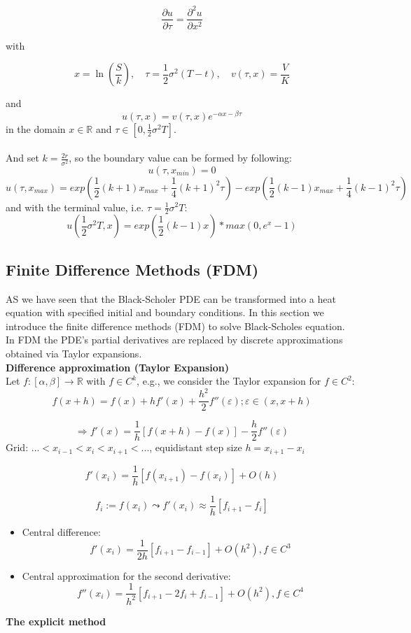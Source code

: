 \documentclass{article}
\begin{document}
$$
\frac{\partial u}{\partial \tau} = \frac{\partial^2 u}{\partial x^2}
$$

with

$$
  x = \ln\left(\frac{S}{k}\right), \quad \tau = \frac{1}{2}\sigma^2(T-t), \quad v(\tau, x) = \frac{V}{K}
$$

and
$$
  u(\tau, x) = v(\tau, x) e^{-\alpha x - \beta \tau}
$$
in the domain $x \in \mathbb{R}$ and $\tau \in [0, \frac{1}{2}\sigma^2T]$.\\\\
And set $k = \frac{2r}{\sigma^2}$, so the boundary value can be formed by following:
$$u(\tau,x_{min}) = 0$$
$$u(\tau,x_{max}) = exp(\frac{1}{2}(k+1)x_{max} + \frac{1}{4}(k+1)^2\tau) -exp(\frac{1}{2}(k-1)x_{max}+\frac{1}{4}(k-1)^2\tau)$$
and with the terminal value, i.e. $\tau = \frac{1}{2}\sigma^2T $:
$$u(\frac{1}{2}\sigma^2T,x) = exp(\frac{1}{2}(k-1)x)*max(0,e^x-1)$$
\subsection{Finite Difference Methods (FDM)}
AS we have seen that the Black-Scholer PDE can be transformed into a heat equation with specified initial and boundary conditions. In this section we introduce the finite difference methods (FDM) to solve Black-Scholes equation. \\

In FDM the PDE's partial derivatives are replaced by discrete approximations obtained via Taylor expansions.\\
\textbf{Difference approximation (Taylor Expansion)}\\
Let $f:[\alpha, \beta] \rightarrow \mathbb{R}$ with $f \in C^k$, e.g., we consider the Taylor expansion for $ f \in C^2$:
$$
f(x+h) = f(x) + hf'(x) + \frac{h^2}{2}f''(\varepsilon); \varepsilon \in (x, x+h)$$

$$
\Rightarrow f'(x) = \frac{1}{h}[f(x+h)-f(x)] - \frac{h}{2}f''(\varepsilon)
$$
Grid: $...<x_{i-1}<x_i<x_{i+1}<...$, equidistant step size $h = x_{i+1} - x_i$

$$
f'(x_i) = \frac{1}{h}[f(x_{i+1}) - f(x_i)]+ O(h)
$$

$$
f_i := f(x_i) \leadsto f'(x_i) \approx \frac{1}{h}[f_{i+1} - f_{i}]
$$
\begin{itemize}
\item Central difference:
$$
f'(x_i) = \frac{1}{2h}[f_{i+1} - f_{i-1}]+O(h^2), f\in C^3
$$
\item Central approximation for the second derivative:
$$
f''(x_i) = \frac{1}{h^2}[f_{i+1} - 2f_i + f_{i-1}]+O(h^2), f\in C^4
$$
\end{itemize}
\textbf{The explicit method}\\
\end{document}
